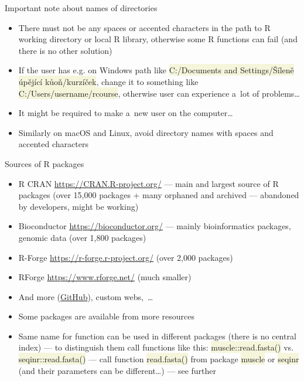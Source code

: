 \documentclass[compress, ucs, xelatex, 11pt, xcolor=svgnames, aspectratio=169,
	hyperref={
		bookmarks=true,
		unicode=true,
		colorlinks=true,
		pdftitle={Molecular data in R},
		plainpages=false,
		pdfauthor={Vojtech Zeisek},
		pdfsubject={Course about phylogeny and evolution in R},
		pdfcreator={XeLaTeX},
		pdfkeywords={R, evolution, phylogeny, molecular data},
		linkcolor=Crimson, %
		anchorcolor=Magenta, %
		citecolor=Magenta, %
		filecolor=Magenta, %
		menucolor=Magenta, %
		urlcolor=DodgerBlue, %
		pdftex},
	url={hyphens, lowtilde} %
	]{beamer}
\renewcommand{\texttt}[1]{\colorbox{Beige}{{\ttfamily #1}}}
\begin{document}
\begin{frame}{Important note about names of directories}
	\begin{itemize}
		\item \alert{There must not be any spaces or accented characters in the path to R working directory or local R library}, otherwise some R functions can fail (and there is no other solution)
		\item If the user has e.g. on Windows path like \texttt{C:/Documents and Settings/Šíleně úpějící kůoň/kurzíček}, change it to something like \texttt{C:/Users/username/rcourse}, otherwise user can experience a~lot of problems\ldots
		\item It might be required to make a~new user on the computer\ldots
		\item Similarly on macOS and Linux, avoid directory names with spaces and accented characters
	\end{itemize}
\end{frame}

\begin{frame}{Sources of R packages}
	\label{sources}
	\begin{itemize}
		\item R CRAN \url{https://CRAN.R-project.org/} --- main and largest source of R packages (over 15,000 packages + many orphaned and archived --- abandoned by developers, might be working)
		\item Bioconductor \url{https://bioconductor.org/} --- mainly bioinformatics packages, genomic data (over 1,800 packages)
		\item R-Forge \url{https://r-forge.r-project.org/} (over 2,000 packages)
		\item RForge \url{https://www.rforge.net/} (much smaller)
		\item And more (\href{https://github.com/}{GitHub}), custom webs,~\ldots
		\item Some packages are available from more resources
		\item Same name for function can be used in different packages (there is no central index) --- to distinguish them call functions like this: \texttt{muscle::read.fasta()} vs. \texttt{seqinr::read.fasta()} --- call function \texttt{read.fasta()} from package \texttt{muscle} \alert{or} \texttt{seqinr} (and their parameters can be different\ldots) --- see further
	\end{itemize}
\end{frame}
\end{document}
